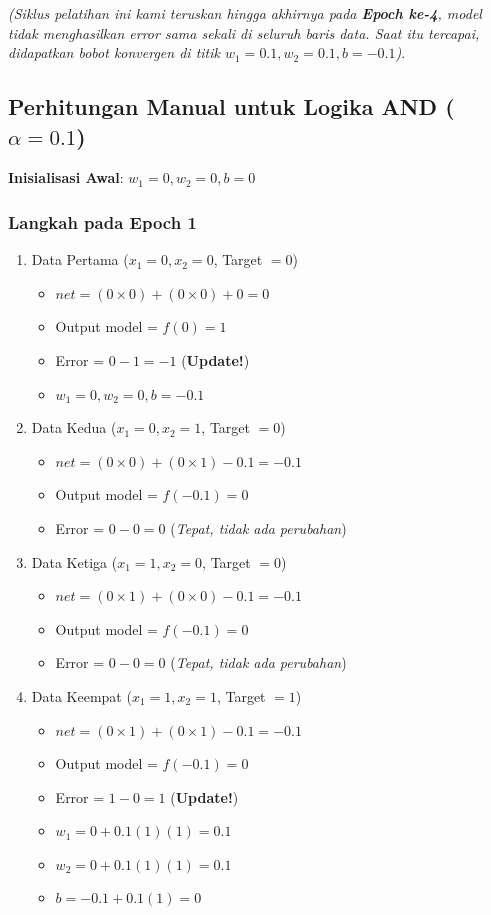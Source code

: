 \documentclass[12pt,a4paper]{article}
\begin{document}
\textit{(Siklus pelatihan ini kami teruskan hingga akhirnya pada \textbf{Epoch ke-4}, model tidak menghasilkan error sama sekali di seluruh baris data. Saat itu tercapai, didapatkan bobot konvergen di titik $w_1=0.1, w_2=0.1, b=-0.1$)}.

\subsection{Perhitungan Manual untuk Logika AND ($\alpha = 0.1$)}
\textbf{Inisialisasi Awal}: $w_1 = 0, w_2 = 0, b = 0$

\subsubsection*{Langkah pada Epoch 1}
\begin{enumerate}
    \item Data Pertama ($x_1=0, x_2=0$, Target $=0$)
    \begin{itemize}
        \item $net = (0 \times 0) + (0 \times 0) + 0 = 0$
        \item Output model = $f(0) = 1$
        \item Error = $0 - 1 = -1$ (\textbf{Update!})
        \item $w_1 = 0, w_2 = 0, b = -0.1$
    \end{itemize}
    \item Data Kedua ($x_1=0, x_2=1$, Target $=0$)
    \begin{itemize}
        \item $net = (0 \times 0) + (0 \times 1) - 0.1 = -0.1$
        \item Output model = $f(-0.1) = 0$
        \item Error = $0 - 0 = 0$ (\textit{Tepat, tidak ada perubahan})
    \end{itemize}
    \item Data Ketiga ($x_1=1, x_2=0$, Target $=0$)
    \begin{itemize}
        \item $net = (0 \times 1) + (0 \times 0) - 0.1 = -0.1$
        \item Output model = $f(-0.1) = 0$
        \item Error = $0 - 0 = 0$ (\textit{Tepat, tidak ada perubahan})
    \end{itemize}
    \item Data Keempat ($x_1=1, x_2=1$, Target $=1$)
    \begin{itemize}
        \item $net = (0 \times 1) + (0 \times 1) - 0.1 = -0.1$
        \item Output model = $f(-0.1) = 0$
        \item Error = $1 - 0 = 1$ (\textbf{Update!})
        \item $w_1 = 0 + 0.1(1)(1) = 0.1$
        \item $w_2 = 0 + 0.1(1)(1) = 0.1$
        \item $b = -0.1 + 0.1(1) = 0$
    \end{itemize}
\end{enumerate}
\end{document}
